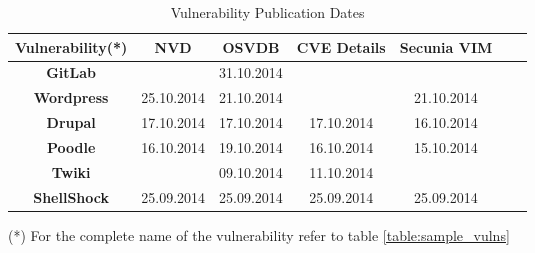 \begin{table}
\begin{center}
    \begin{tabular}{ | c || c | c | c | c | c | c |}
    
    \hline
	
      Vulnerability(*) & \textbf{NVD}  &  \textbf{OSVDB} & \textbf{CVE Details} & \textbf{Secunia VIM} 
	\\ 
	\hline  
	\hhline{~|*4-}  
	\textbf{GitLab} & \multicolumn{1}{|c|}{\cellcolor{red!25}} & \multicolumn{1}{|c}{\cellcolor{green!25} 31.10.2014} & \multicolumn{1}{|c|}{\cellcolor{red!25}} & \multicolumn{1}{|c|}{\cellcolor{red!25}} 
    \\ 
	\hline   
	\hhline{~|*4-} 
	 \textbf{Wordpress} & \multicolumn{1}{|c|}{\cellcolor{yellow!25} 25.10.2014} & \multicolumn{1}{|c}{\cellcolor{green!25} 21.10.2014} & \multicolumn{1}{|c|}{\cellcolor{red!25}} & \multicolumn{1}{|c|}{\cellcolor{green!25} 21.10.2014} 
	  \\ 
	\hline
	\hhline{~|*4-} 
	 \textbf{Drupal} & \multicolumn{1}{|c|}{\cellcolor{yellow!25}17.10.2014} & \multicolumn{1}{|c}{\cellcolor{yellow!25}17.10.2014} & \multicolumn{1}{|c|}{\cellcolor{yellow!25}17.10.2014} & \multicolumn{1}{|c|}{\cellcolor{green!25}16.10.2014}
	  \\ 
	\hline
	\hhline{~|*4-} 
	 \textbf{Poodle} & \multicolumn{1}{|c|}{\cellcolor{yellow!25}16.10.2014} & \multicolumn{1}{|c}{\cellcolor{yellow!25}19.10.2014} & \multicolumn{1}{|c|}{\cellcolor{yellow!25}16.10.2014} & \multicolumn{1}{|c|}{\cellcolor{green!25}15.10.2014}
	  \\ 
	\hline 
	\hhline{~|*4-} 
	 \textbf{Twiki} & \multicolumn{1}{|c|}{\cellcolor{red!25}} & \multicolumn{1}{|c}{\cellcolor{green!25} 09.10.2014} & \multicolumn{1}{|c|}{\cellcolor{yellow!25} 11.10.2014} &\multicolumn{1}{|c|}{\cellcolor{red!25}}
	  \\ 
	\hline 
	\hhline{~|*4-} 
	 \textbf{ShellShock} & \multicolumn{1}{|c|}{\cellcolor{green!25}25.09.2014} & \multicolumn{1}{|c}{\cellcolor{green!25}25.09.2014} & \multicolumn{1}{|c|}{\cellcolor{green!25}25.09.2014} &\multicolumn{1}{|c|}{\cellcolor{green!25} 25.09.2014} 
	 \\
	 \hline
     
\end{tabular}
    \caption{Vulnerability Publication Dates}
    \label{table:source_speed}
    \footnotesize{(*) For the complete name of the vulnerability refer to table \ref{table:sample_vulns}}
   \end{center}
    \end{table}





